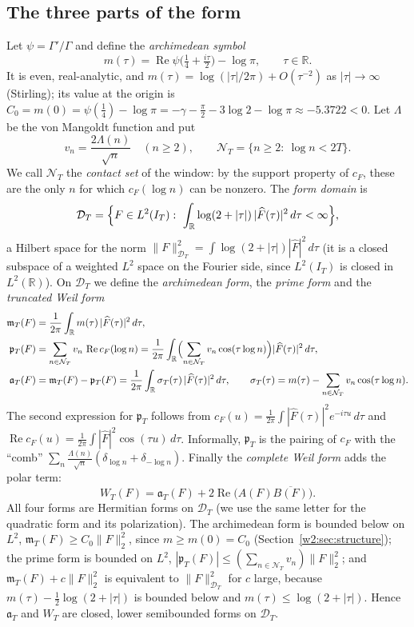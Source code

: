 \documentclass[11pt]{amsart}
\theoremstyle{definition}
\theoremstyle{remark}
\numberwithin{equation}{section}
\newcommand{\R}{\mathbb{R}}
\DeclareMathOperator{\Rel}{Re}
\newcommand{\IT}{I_T}                                  %
\newcommand{\Fh}{\widehat F}                           %
\newcommand{\cF}{c_F}                                  %
\newcommand{\DT}{\mathcal{D}_T}                        %
\newcommand{\NT}{\mathcal{N}_T}                        %
\newcommand{\mT}{\mathfrak{m}_T}                       %
\newcommand{\pT}{\mathfrak{p}_T}                       %
\newcommand{\aT}{\mathfrak{a}_T}                       %
\newcommand{\WT}{W_T}                                  %
\newcommand{\sT}{\sigma_T}                             %
\begin{document}
\subsection{The three parts of the form}
Let $\psi=\Gamma'/\Gamma$ and define the \emph{archimedean symbol}
\begin{equation}\label{w1:eq:symbol-m}
  m(\tau)=\Rel\psi\bigl(\tfrac14+\tfrac{i\tau}2\bigr)-\log\pi ,\qquad
  \tau\in\R .
\end{equation}
It is even, real-analytic, and $m(\tau)=\log(|\tau|/2\pi)+O(\tau^{-2})$ as
$|\tau|\to\infty$ (Stirling); its value at the origin is
$C_0=m(0)=\psi(\tfrac14)-\log\pi=-\gamma-\tfrac\pi2-3\log2-\log\pi\approx-5.3722<0$.
Let $\Lambda$ be the von Mangoldt function and put
\begin{equation}\label{w1:eq:weights}
  v_n=\frac{2\Lambda(n)}{\sqrt n}\quad(n\ge2),\qquad
  \NT=\{n\ge2:\ \log n<2T\}.
\end{equation}
We call $\NT$ the \emph{contact set} of the window: by the support property of
$\cF$, these are the only $n$ for which $\cF(\log n)$ can be nonzero.
The \emph{form domain} is
\[
  \DT=\Bigl\{F\in L^2(\IT):\ \int_\R\log(2+|\tau|)\,|\Fh(\tau)|^2\,d\tau<\infty\Bigr\},
\]
a Hilbert space for the norm
$\|F\|_{\DT}^2=\int\log(2+|\tau|)|\Fh|^2\,d\tau$ (it is a closed subspace of
a weighted $L^2$ space on the Fourier side, since $L^2(\IT)$ is closed in
$L^2(\R)$). On $\DT$ we define the \emph{archimedean form}, the \emph{prime
form} and the \emph{truncated Weil form}
\begin{align}
  \mT(F)&=\frac1{2\pi}\int_\R m(\tau)\,|\Fh(\tau)|^2\,d\tau,\label{w1:eq:arch}\\
  \pT(F)&=\sum_{n\in\NT}v_n\,\Rel\cF(\log n)
         =\frac1{2\pi}\int_\R\Bigl(\sum_{n\in\NT}v_n\cos(\tau\log n)\Bigr)|\Fh(\tau)|^2\,d\tau,\label{w1:eq:prime}\\
  \aT(F)&=\mT(F)-\pT(F)=\frac1{2\pi}\int_\R\sT(\tau)\,|\Fh(\tau)|^2\,d\tau,
  \qquad \sT(\tau)=m(\tau)-\sum_{n\in\NT}v_n\cos(\tau\log n).\label{w1:eq:trunc}
\end{align}
The second expression for $\pT$ follows from
$\cF(u)=\frac1{2\pi}\int|\Fh(\tau)|^2e^{-i\tau u}\,d\tau$ and
$\Rel\cF(u)=\frac1{2\pi}\int|\Fh|^2\cos(\tau u)\,d\tau$. Informally, $\pT$ is
the pairing of $\cF$ with the ``comb'' $\sum_{n}\frac{\Lambda(n)}{\sqrt n}(\delta_{\log n}+\delta_{-\log n})$.
Finally the \emph{complete Weil form} adds the polar term:
\begin{equation}\label{w1:eq:complete}
  \WT(F)=\aT(F)+2\Rel\bigl(A(F)\overline{B(F)}\bigr).
\end{equation}
All four forms are Hermitian forms on $\DT$ (we use the same letter for the
quadratic form and its polarization). The archimedean form is bounded below
on $L^2$, $\mT(F)\ge C_0\|F\|_2^2$, since $m\ge m(0)=C_0$ (Section~\ref{w2:sec:structure}); the prime form is
bounded on $L^2$, $|\pT(F)|\le(\sum_{n\in\NT}v_n)\|F\|_2^2$; and $\mT(F)+c\|F\|_2^2$
is equivalent to $\|F\|_{\DT}^2$ for $c$ large, because
$m(\tau)-\frac12\log(2+|\tau|)$ is bounded below and $m(\tau)\le\log(2+|\tau|)$.
Hence $\aT$ and $\WT$ are closed, lower semibounded forms on $\DT$.
\end{document}
